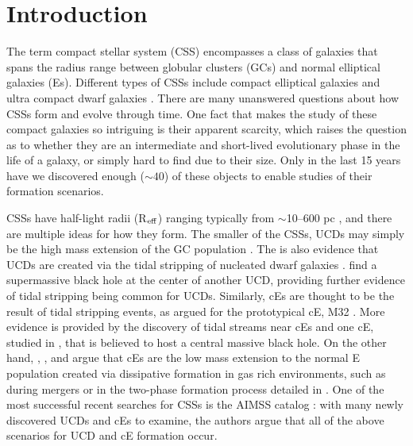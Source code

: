 \documentclass[iop,apj]{emulateapj}
\newcommand{\Reff}{R$_{\rm eff}$}
\begin{document}
\section{Introduction}
\label{intro}

  The term compact stellar system (CSS) encompasses a class of galaxies that spans the radius range between globular clusters (GCs) and normal elliptical galaxies (Es). Different types of CSSs include compact elliptical galaxies \citep[cEs;][]{Faber1973} and ultra compact dwarf galaxies \citep[UCDs;][]{Phillipps2001}. There are many unanswered questions about how CSSs form and evolve through time. One fact that makes the study of these compact galaxies so intriguing is their apparent scarcity, which raises the question as to whether they are an intermediate and short-lived evolutionary phase in the life of a galaxy, or simply hard to find due to their size. Only in the last 15 years have we discovered enough ($\sim 40$) of these objects to enable studies of their formation scenarios.

CSSs have half-light radii (\Reff) ranging typically from $\sim$10--600 pc \citep[e.g.,][]{Norris2014}, and there are multiple ideas for how they form. The smaller of the CSSs, UCDs may simply be the high mass extension of the GC population \citep{Drinkwater2000, Mieske2002}. The is also evidence that UCDs are created via the tidal stripping of nucleated dwarf galaxies \citep{Bekki2001, Bekki2003, Norris2011, Jennings2015, Zhang2015}. \citet{Seth2014} find a supermassive black hole at the center of another UCD, providing further evidence of tidal stripping being common for UCDs. Similarly, cEs are thought to be the result of tidal stripping events, as argued for the prototypical cE, M32 \citep{Choi2002, Graham2002, Huxor2011}. More evidence is provided by the discovery of tidal streams near cEs \citep{SmithCastelli2008a,Chilingarian2009} and one cE, studied in \citet{Kormendy1997}, that is believed to host a central massive black hole. On the other hand, \citet{Wirth1984}, \citet{Kormendy2009}, and \citet{Kormendy2012a} argue that cEs are the low mass extension to the normal E population created via dissipative formation in gas rich environments, such as during mergers or in the two-phase formation process detailed in \citet{Oser2010}. One of the most successful recent searches for CSSs is the AIMSS catalog \citep{Norris2014}: with many newly discovered UCDs and cEs to examine, the authors argue that all of the above scenarios for UCD and cE formation occur.
\end{document}
